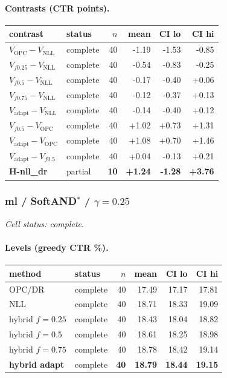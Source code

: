 \documentclass[10pt,a4paper]{article}
\begin{document}
\paragraph{Contrasts (CTR points).}
{\centering\small\begin{tabular}{llrrrr}
\toprule contrast & status & $n$ & mean & CI lo & CI hi \\
\midrule
$V_{\mathrm{OPC}}-V_{\mathrm{NLL}}$ & complete & 40 & -1.19 & -1.53 & -0.85 \\
$V_{f0.25}-V_{\mathrm{NLL}}$ & complete & 40 & -0.54 & -0.83 & -0.25 \\
$V_{f0.5}-V_{\mathrm{NLL}}$ & complete & 40 & -0.17 & -0.40 & +0.06 \\
$V_{f0.75}-V_{\mathrm{NLL}}$ & complete & 40 & -0.12 & -0.37 & +0.13 \\
$V_{\mathrm{adapt}}-V_{\mathrm{NLL}}$ & complete & 40 & -0.14 & -0.40 & +0.12 \\
$V_{f0.5}-V_{\mathrm{OPC}}$ & complete & 40 & +1.02 & +0.73 & +1.31 \\
$V_{\mathrm{adapt}}-V_{\mathrm{OPC}}$ & complete & 40 & +1.08 & +0.70 & +1.46 \\
$V_{\mathrm{adapt}}-V_{f0.5}$ & complete & 40 & +0.04 & -0.13 & +0.21 \\
\textbf{H-nll\_dr} & partial & \textbf{10} & \textbf{+1.24} & \textbf{-1.28} & \textbf{+3.76} \\
\bottomrule\end{tabular}\par}
\bigskip
\subsubsection{ml / SoftAND$^*$ / $\gamma=0.25$}
\emph{Cell status: complete}.
\paragraph{Levels (greedy CTR \%).}
{\centering\small\begin{tabular}{llrrrr}
\toprule method & status & $n$ & mean & CI lo & CI hi \\
\midrule
OPC/DR & complete & 40 & 17.49 & 17.17 & 17.81 \\
NLL & complete & 40 & 18.71 & 18.33 & 19.09 \\
hybrid $f{=}0.25$ & complete & 40 & 18.43 & 18.04 & 18.82 \\
hybrid $f{=}0.5$ & complete & 40 & 18.61 & 18.25 & 18.98 \\
hybrid $f{=}0.75$ & complete & 40 & 18.78 & 18.42 & 19.14 \\
\textbf{hybrid adapt} & complete & \textbf{40} & \textbf{18.79} & \textbf{18.44} & \textbf{19.15} \\
\bottomrule\end{tabular}\par}
\end{document}
